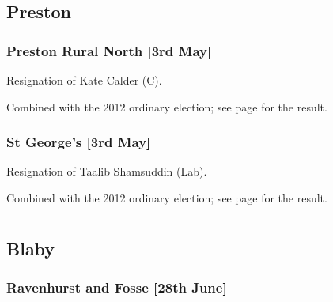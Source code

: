 \documentclass[a4paper,openany]{book}
\begin{document}
\begin{resultsiii}
\subsection*{Preston}

\subsubsection*{Preston Rural North \hspace*{\fill}\nolinebreak[1]%
\enspace\hspace*{\fill}
[3rd May]}


Resignation of Kate Calder (C).

Combined with the 2012 ordinary election; see page \pageref{PrestonRuralNorthPreston} for the result.

\subsubsection*{St George's \hspace*{\fill}\nolinebreak[1]%
\enspace\hspace*{\fill}
[3rd May]}


Resignation of Taalib Shamsuddin (Lab).

Combined with the 2012 ordinary election; see page \pageref{SaintGeorgesPreston} for the result.

\section[Leicestershire]{}

\subsection*{Blaby}

\subsubsection*{Ravenhurst and Fosse \hspace*{\fill}\nolinebreak[1]%
\enspace\hspace*{\fill}
[28th June]}



\end{resultsiii}
\end{document}
